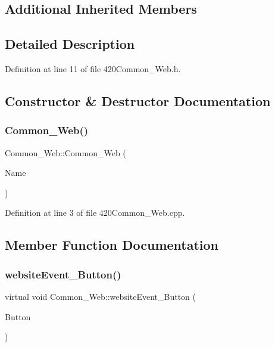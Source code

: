 \subsection*{Additional Inherited Members}


\subsection{Detailed Description}


Definition at line 11 of file 420\+Common\+\_\+\+Web.\+h.



\subsection{Constructor \& Destructor Documentation}
\mbox{\label{class_common___web_a01b0113c6e18ba13fa5fdf9e4b031b09}} 
\subsubsection{\texorpdfstring{Common\+\_\+\+Web()}{Common\_Web()}}
{\footnotesize\ttfamily Common\+\_\+\+Web\+::\+Common\+\_\+\+Web (\begin{DoxyParamCaption}\item[{const \+\_\+\+\_\+\+Flash\+String\+Helper $\ast$}]{Name }\end{DoxyParamCaption})\hspace{0.3cm}{\ttfamily [protected]}}



Definition at line 3 of file 420\+Common\+\_\+\+Web.\+cpp.



\subsection{Member Function Documentation}
\mbox{\label{class_common___web_acd10f27b30f3111277b4730ee5495090}} 
\subsubsection{\texorpdfstring{website\+Event\+\_\+\+Button()}{websiteEvent\_Button()}}
{\footnotesize\ttfamily virtual void Common\+\_\+\+Web\+::website\+Event\+\_\+\+Button (\begin{DoxyParamCaption}\item[{\+\_\+\+\_\+attribute\+\_\+\+\_\+((unused)) char $\ast$}]{Button }\end{DoxyParamCaption})\hspace{0.3cm}{\ttfamily [pure virtual]}}



